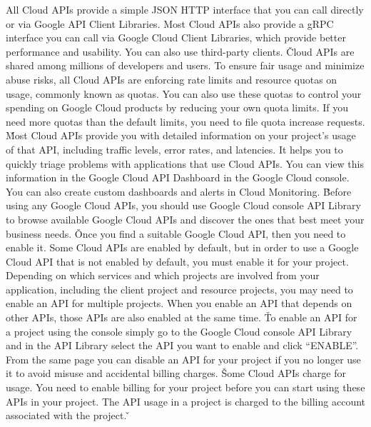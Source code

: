 All Cloud APIs provide a simple JSON HTTP interface that you can call directly or via Google API Client Libraries.
Most Cloud APIs also provide a gRPC interface you can call via Google Cloud Client Libraries, which provide better
performance and usability. You can also use third-party clients. \v

Cloud APIs are shared among millions of developers and users. To ensure fair usage and minimize abuse risks, all
Cloud APIs are enforcing rate limits and resource quotas on usage, commonly known as quotas. You can also use these
quotas to control your spending on Google Cloud products by reducing your own quota limits. If you need more quotas
than the default limits, you need to file quota increase requests. \v

Most Cloud APIs provide you with detailed information on your project's usage of that API, including traffic levels,
error rates, and latencies. It helps you to quickly triage problems with applications that use Cloud APIs. You can
view this information in the Google Cloud API Dashboard in the Google Cloud console. You can also create custom
dashboards and alerts in Cloud Monitoring. \v

Before using any Google Cloud APIs, you should use Google Cloud console API Library to browse available Google Cloud
APIs and discover the ones that best meet your business needs. \v

Once you find a suitable Google Cloud API, then you need to enable it. Some Cloud APIs are enabled by default, but in
order to use a Google Cloud API that is not enabled by default, you must enable it for your project. Depending on which
services and which projects are involved from your application, including the client project and resource projects,
you may need to enable an API for multiple projects. When you enable an API that depends on other APIs, those APIs
are also enabled at the same time. \v

To enable an API for a project using the console simply go to the Google Cloud console API Library and in the API
Library select the API you want to enable and click ``ENABLE''. From the same page you can disable an API for your
project if you no longer use it to avoid misuse and accidental billing charges. \v

Some Cloud APIs charge for usage. You need to enable billing for your project before you can start using these APIs
in your project. The API usage in a project is charged to the billing account associated with the project. \v

